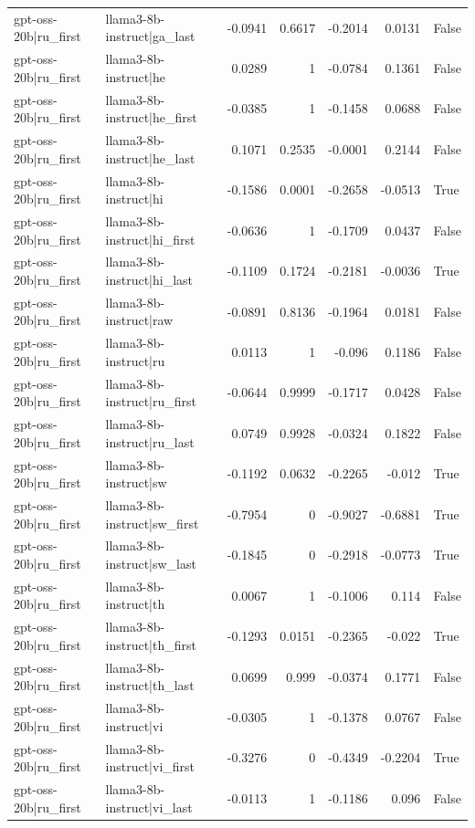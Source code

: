 \begin{table}
\begin{tabular}{l l r r r r l}
gpt-oss-20b|ru_first & llama3-8b-instruct|ga_last & -0.0941 & 0.6617 & -0.2014 & 0.0131 & False \\
gpt-oss-20b|ru_first & llama3-8b-instruct|he & 0.0289 & 1 & -0.0784 & 0.1361 & False \\
gpt-oss-20b|ru_first & llama3-8b-instruct|he_first & -0.0385 & 1 & -0.1458 & 0.0688 & False \\
gpt-oss-20b|ru_first & llama3-8b-instruct|he_last & 0.1071 & 0.2535 & -0.0001 & 0.2144 & False \\
gpt-oss-20b|ru_first & llama3-8b-instruct|hi & -0.1586 & 0.0001 & -0.2658 & -0.0513 & True \\
gpt-oss-20b|ru_first & llama3-8b-instruct|hi_first & -0.0636 & 1 & -0.1709 & 0.0437 & False \\
gpt-oss-20b|ru_first & llama3-8b-instruct|hi_last & -0.1109 & 0.1724 & -0.2181 & -0.0036 & True \\
gpt-oss-20b|ru_first & llama3-8b-instruct|raw & -0.0891 & 0.8136 & -0.1964 & 0.0181 & False \\
gpt-oss-20b|ru_first & llama3-8b-instruct|ru & 0.0113 & 1 & -0.096 & 0.1186 & False \\
gpt-oss-20b|ru_first & llama3-8b-instruct|ru_first & -0.0644 & 0.9999 & -0.1717 & 0.0428 & False \\
gpt-oss-20b|ru_first & llama3-8b-instruct|ru_last & 0.0749 & 0.9928 & -0.0324 & 0.1822 & False \\
gpt-oss-20b|ru_first & llama3-8b-instruct|sw & -0.1192 & 0.0632 & -0.2265 & -0.012 & True \\
gpt-oss-20b|ru_first & llama3-8b-instruct|sw_first & -0.7954 & 0 & -0.9027 & -0.6881 & True \\
gpt-oss-20b|ru_first & llama3-8b-instruct|sw_last & -0.1845 & 0 & -0.2918 & -0.0773 & True \\
gpt-oss-20b|ru_first & llama3-8b-instruct|th & 0.0067 & 1 & -0.1006 & 0.114 & False \\
gpt-oss-20b|ru_first & llama3-8b-instruct|th_first & -0.1293 & 0.0151 & -0.2365 & -0.022 & True \\
gpt-oss-20b|ru_first & llama3-8b-instruct|th_last & 0.0699 & 0.999 & -0.0374 & 0.1771 & False \\
gpt-oss-20b|ru_first & llama3-8b-instruct|vi & -0.0305 & 1 & -0.1378 & 0.0767 & False \\
gpt-oss-20b|ru_first & llama3-8b-instruct|vi_first & -0.3276 & 0 & -0.4349 & -0.2204 & True \\
gpt-oss-20b|ru_first & llama3-8b-instruct|vi_last & -0.0113 & 1 & -0.1186 & 0.096 & False \\

\end{tabular}
\end{table}
